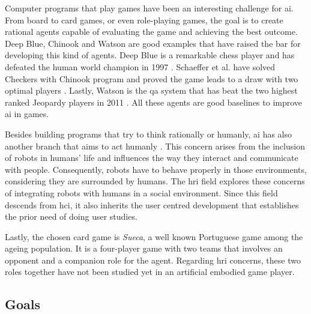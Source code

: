 Computer programs that play games have been an interesting challenge for \gls{ai}.
From board to card games, or even role-playing games, the goal is to create rational agents capable of evaluating the game and achieving the best outcome.
Deep Blue, Chinook and Watson are good examples that have raised the bar for developing this kind of agents.
Deep Blue is a remarkable chess player and has defeated the human world champion in 1997 \cite{Campbell2002}.
Schaeffer et al. have solved Checkers with Chinook program and proved the game leads to a draw with two optimal players \cite{Schaeffer1996}.
Lastly, Watson is the \gls{qa} system that has beat the two highest ranked Jeopardy players in 2011 \cite{Ferrucci2010}.
All these agents are good baselines to improve \gls{ai} in games.


Besides building programs that try to think rationally or humanly, \gls{ai} has also another branch that aims to act humanly \cite{Russell2009}.
This concern arises from the inclusion of robots in humans' life and influences the way they interact and communicate with people.
Consequently, robots have to behave properly in those environments, considering they are surrounded by humans.
The \gls{hri} field explores these concerns of integrating robots with humans in a social environment.
Since this field descends from \gls{hci}, it also inherits the user centred development that establishes the prior need of doing user studies.





Lastly, the chosen card game is \emph{Sueca}, a well known Portuguese game among the ageing population.
It is a four-player game with two teams that involves an opponent and a companion role for the agent.
Regarding \gls{hri} concerns, these two roles together have not been studied yet in an artificial embodied game player.



\subsection{Goals}
\label{sec:goals}

